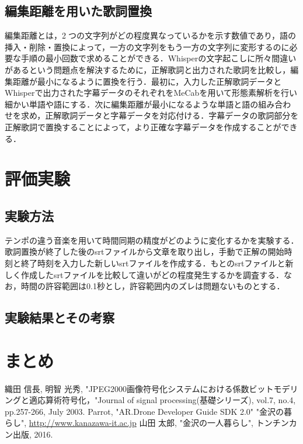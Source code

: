 \begin{multicols*}{2}
\subsection{編集距離を用いた歌詞置換}
編集距離とは，2⃣つの文字列がどの程度異なっているかを示す数値であり，語の挿入・削除・置換によって，一方の文字列をもう一方の文字列に変形するのに必要な手順の最小回数で求めることができる．Whisperの文字起こしに所々間違いがあるという問題点を解決するために，正解歌詞と出力された歌詞を比較し，編集距離が最小になるように置換を行う．最初に，入力した正解歌詞データとWhisperで出力された字幕データのそれぞれをMeCabを用いて形態素解析を行い細かい単語や語にする．次に編集距離が最小になるような単語と語の組み合わせを求め，正解歌詞データと字幕データを対応付ける．字幕データの歌詞部分を正解歌詞で置換することによって，より正確な字幕データを作成することができる．

\section{評価実験}

\subsection{実験方法}
テンポの違う音楽を用いて時間同期の精度がどのように変化するかを実験する．歌詞置換が終了した後のsrtファイルから文章を取り出し，手動で正解の開始時刻と終了時刻を入力した新しいsrtファイルを作成する．もとのsrtファイルと新しく作成したsrtファイルを比較して違いがどの程度発生するかを調査する．なお，時間の許容範囲は0.1秒とし，許容範囲内のズレは問題ないものとする．

\subsection{実験結果とその考察}


\section{まとめ}


\begin{thebibliography}{99}
 織田 信長, 明智 光秀, "JPEG2000画像符号化システムにおける係数ビットモデリングと適応算術符号化，"Journal of signal processing(基礎シリーズ), vol.7, no.4, pp.257-266, July 2003.
Parrot, "AR.Drone Developer Guide SDK 2.0"
 "金沢の暮らし", \url{http://www.kanazawa-it.ac.jp}
 山田 太郎, "金沢の一人暮らし", トンチンカン出版, 2016.
\end{thebibliography}

\end{multicols*} 


